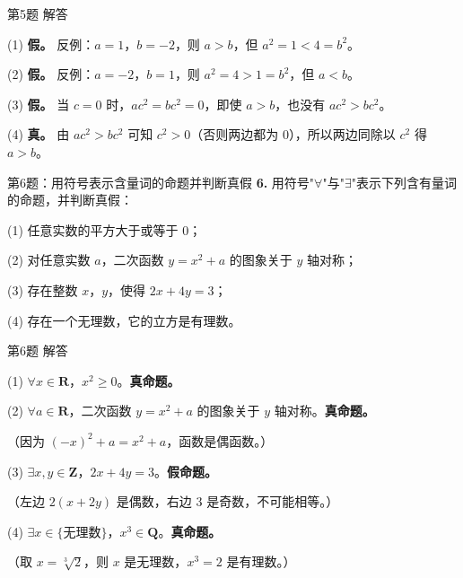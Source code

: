 \documentclass[10pt,aspectratio=169,serif]{beamer}
\begin{document}
\begin{frame}[t]{第5题 解答}
\begin{tcolorbox}[colback=orange!10,colframe=orange,title=\textbf{解}]
(1) \textbf{假。} 反例：$a = 1$，$b = -2$，则 $a > b$，但 $a^2 = 1 < 4 = b^2$。

\vspace{0.5em}
(2) \textbf{假。} 反例：$a = -2$，$b = 1$，则 $a^2 = 4 > 1 = b^2$，但 $a < b$。

\vspace{0.5em}
(3) \textbf{假。} 当 $c = 0$ 时，$ac^2 = bc^2 = 0$，即使 $a > b$，也没有 $ac^2 > bc^2$。

\vspace{0.5em}
(4) \textbf{真。} 由 $ac^2 > bc^2$ 可知 $c^2 > 0$（否则两边都为 $0$），所以两边同除以 $c^2$ 得 $a > b$。
\end{tcolorbox}
\end{frame}

\begin{frame}[t]{第6题：用符号表示含量词的命题并判断真假}
\textbf{6.} 用符号"$\forall$"与"$\exists$"表示下列含有量词的命题，并判断真假：

\vspace{0.5em}
(1) 任意实数的平方大于或等于 $0$；

\vspace{0.3em}
(2) 对任意实数 $a$，二次函数 $y = x^2 + a$ 的图象关于 $y$ 轴对称；

\vspace{0.3em}
(3) 存在整数 $x$，$y$，使得 $2x + 4y = 3$；

\vspace{0.3em}
(4) 存在一个无理数，它的立方是有理数。
\end{frame}

\begin{frame}[t]{第6题 解答}
\begin{tcolorbox}[colback=orange!10,colframe=orange,title=\textbf{解}]
(1) $\forall x \in \mathbf{R}$，$x^2 \ge 0$。\textbf{真命题。}

\vspace{0.5em}
(2) $\forall a \in \mathbf{R}$，二次函数 $y = x^2 + a$ 的图象关于 $y$ 轴对称。\textbf{真命题。}

\vspace{0.3em}
\small（因为 $(-x)^2 + a = x^2 + a$，函数是偶函数。）

\vspace{0.5em}
(3) $\exists x, y \in \mathbf{Z}$，$2x + 4y = 3$。\textbf{假命题。}

\vspace{0.3em}
\small（左边 $2(x+2y)$ 是偶数，右边 $3$ 是奇数，不可能相等。）

\vspace{0.5em}
(4) $\exists x \in \{\text{无理数}\}$，$x^3 \in \mathbf{Q}$。\textbf{真命题。}

\vspace{0.3em}
\small（取 $x = \sqrt[3]{2}$，则 $x$ 是无理数，$x^3 = 2$ 是有理数。）
\end{tcolorbox}
\end{frame}
\end{document}
